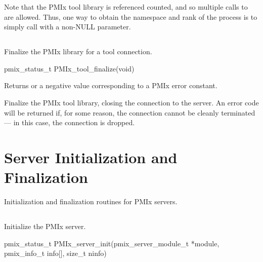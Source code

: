 Note that the \ac{PMIx} tool library is referenced counted, and so multiple calls to  are allowed.
Thus, one way to obtain the namespace and rank of the process is to simply call  with a non-NULL parameter.


\subsection{}

\summary

Finalize the \ac{PMIx} library for a tool connection.

\format

\cspecificstart
\begin{codepar}
pmix_status_t
PMIx_tool_finalize(void)
\end{codepar}
\cspecificend

Returns  or a negative value corresponding to a PMIx error constant.

\descr

Finalize the PMIx tool library, closing the connection to the server.
An error code will be returned if, for some reason, the connection cannot be cleanly terminated --- in this case, the connection is dropped.


\section{Server Initialization and Finalization}
\label{chap:api_init:server}

Initialization and finalization routines for \ac{PMIx} servers.

\subsection{}

\summary

Initialize the \ac{PMIx} server.

\format

\cspecificstart
\begin{codepar}
pmix_status_t
PMIx_server_init(pmix_server_module_t *module,
                 pmix_info_t info[], size_t ninfo)
\end{codepar}
\cspecificend

